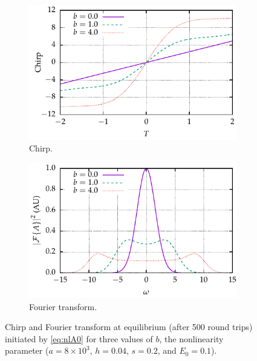 \documentclass[9pt,twocolumn,twoside]{osajnl}
\begin{document}
\begin{figure}[tbp]
	\centering
	\begin{subfigure}{\columnwidth}
		\centering
		\includegraphics{Figures/Chirp}
		\caption{Chirp.}
		\label{fig:chirp}
	\end{subfigure} \hfill
	\begin{subfigure}{\columnwidth}
		\centering
		\includegraphics{Figures/FT}
		\caption{Fourier transform.}
		\label{fig:ft}
	\end{subfigure}
	\caption{Chirp and Fourier transform at equilibrium (after 500 round trips) initiated by \eqref{eq:nlA0} for three values of $b$, the nonlinearity parameter ($a = 8 \times 10^3$, $h = 0.04$, $s = 0.2$, and $E_0 = 0.1$).}
	\label{fig:chirpft}
\end{figure}
\end{document}
